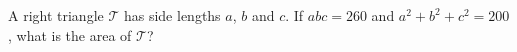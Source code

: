 A right triangle $\mathcal{T}$ has side lengths $a$, $b$ and $c$. If $abc=260$ and $a^2+b^2+c^2=200$, what is the area of $\mathcal{T}$?
